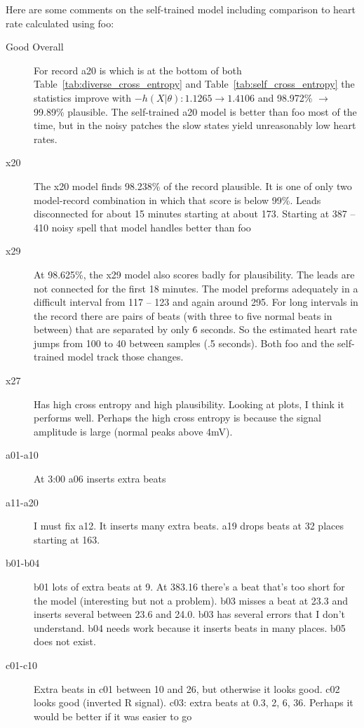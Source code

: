 \documentclass[12pt]{article}
\begin{document}
Here are some comments on the self-trained model including comparison
to heart rate calculated using foo:
\begin{description}
\item[Good Overall] For record a20 is which is at the bottom of both
  Table~\ref{tab:diverse_cross_entropy} and
  Table~\ref{tab:self_cross_entropy} the statistics improve with
  $-h(X|\theta): 1.1265 \rightarrow 1.4106$ and 98.972\% $\rightarrow$
  99.89\% plausible.  The self-trained a20 model is better than foo
  most of the time, but in the noisy patches the slow states yield
  unreasonably low heart rates.
\item[x20] The x20 model finds 98.238\% of the record plausible.  It
  is one of only two model-record combination in which that score is
  below 99\%.  Leads disconnected for about 15 minutes starting at
  about 173.  Starting at 387 -- 410 noisy spell that model handles
  better than foo
\item[x29] At 98.625\%, the x29 model also scores badly for
  plausibility.  The leads are not connected for the first 18 minutes.
  The model preforms adequately in a difficult interval from 117 --
  123 and again around 295.  For long intervals in the record there
  are pairs of beats (with three to five normal beats in between) that
  are separated by only \.6 seconds.  So the estimated heart rate jumps
  from 100 to 40 between samples (.5 seconds).  Both foo and the
  self-trained model track those changes.
\item[x27] Has high cross entropy and high plausibility.  Looking at
  plots, I think it performs well.  Perhaps the high cross entropy is
  because the signal amplitude is large (normal peaks above 4mV).
\item[a01-a10] At 3:00 a06 inserts extra beats
\item[a11-a20] I must fix a12.  It inserts many extra beats.  a19
  drops beats at 32 places starting at 163.
\item[b01-b04] b01 lots of extra beats at 9.  At 383.16 there's a beat
  that's too short for the model (interesting but not a problem).  b03
  misses a beat at 23.3 and inserts several between 23.6 and 24.0.
  b03 has several errors that I don't understand.  b04 needs work
  because it inserts beats in many places.  b05 does not exist.
\item[c01-c10] Extra beats in c01 between 10 and 26, but otherwise it
  looks good.  c02 looks good (inverted R signal).  c03: extra beats
  at 0.3, 2, 6, 36.  Perhaps it would be better if it was easier to go

\end{description}
\end{document}
